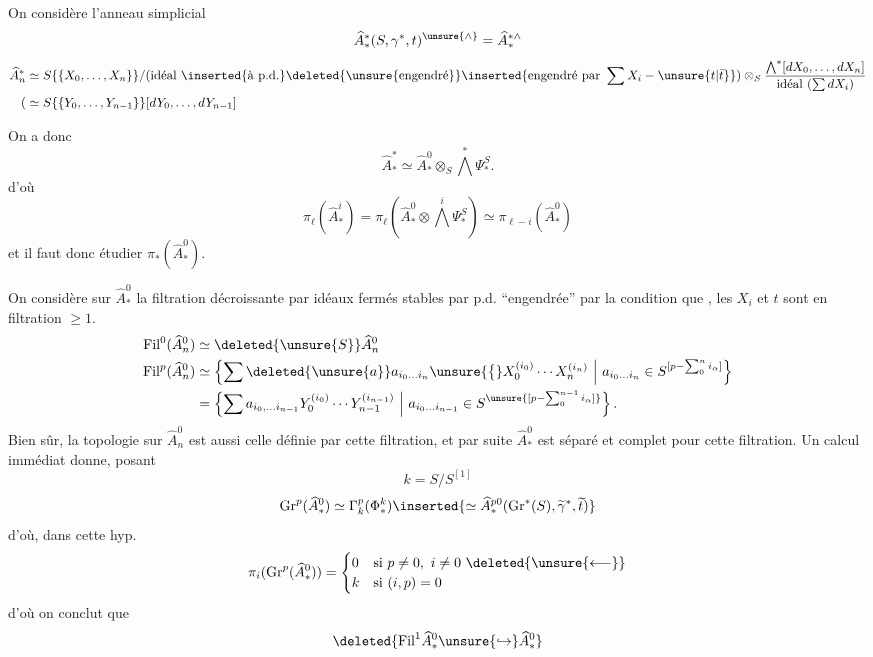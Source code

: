On considère l'anneau simplicial
\[
\widehat A_*^*(S,\gamma^*,t)^{\unsure{\wedge}}=\widehat A_*^{*\wedge}
\]
\[
\begin{aligned}
\widehat A_n^*&\simeq S\{\{X_0,\ldots,X_n\}\}/(\text{idéal }\inserted{\text{à p.d.}}\deleted{\text{\unsure{engendré}}}\inserted{\text{engendré par }\sum X_i-\unsure{t|\bar t}})\otimes_S\frac{\bigwedge^*[dX_0,\ldots,dX_n]}{\text{idéal }(\sum dX_i)}\\
(&\simeq S\{\{Y_0,\ldots,Y_{n-1}\}\}[dY_0,\ldots,dY_{n-1}]
\end{aligned}
\]
\deleted{$\simeq$}

On a donc
\[
\widehat A_*^*\simeq\widehat A_*^0\otimes_S\bigwedge^*\Psi_*^S.
\]
d'où
\[
\pi_\ell(\widehat A_*^i)=\pi_\ell(\widehat A_*^0\otimes\bigwedge^i\Psi_*^S)\simeq\pi_{\ell-i}(\widehat A_*^0)
\]
et il faut donc étudier $\pi_*(\widehat A_*^0)$.

On considère sur $\widehat A_*^0$  la filtration décroissante par idéaux fermés stables par p.d. ``engendrée'' par la condition que  , les $X_i$ et $t$ sont en filtration $\geq1$. 
\[
\begin{aligned}
\mathrm{Fil}^0(\widehat A_n^0)&\simeq\deleted{\unsure{S}}\widehat A_n^0\\
\mathrm{Fil}^p(\widehat A_n^0)&\simeq\left\{\sum\deleted{\unsure{a}}a_{i_0\ldots i_n}\unsure{\big\{}X_0^{(i_0)}\cdots X_n^{(i_n)}\ \middle|\ a_{i_0\ldots i_n}\in S^{[p-\sum_0^n i_\alpha]}\right\}\\
&=\left\{\sum a_{i_0,\ldots i_{n-1}}Y_0^{(i_0)}\cdots Y_{n-1}^{(i_{n-1})}\ \middle|\ a_{i_0\ldots i_{n-1}}\in S^{\unsure{[p-\sum_0^{n-1}i_\alpha]}}\right\}.
\end{aligned}
\]
Bien sûr, la topologie  sur $\widehat A_n^0$ est aussi celle définie par cette filtration, et par suite $\widehat A_*^0$ est séparé et complet pour cette filtration. Un calcul immédiat donne, posant
\[
k=S/S^{[1]}
\]
\[
\mathrm{Gr}^p(\widehat A_*^0)\simeq\Gamma_k^p(\Phi_*^k)
\inserted{\simeq\widehat A_*^{p0}(\mathrm{Gr}^*(S),\widetilde\gamma^*,\widetilde t)}
\]
d'où, dans cette hyp. 
\[
\pi_i(\mathrm{Gr}^p(\widehat A_*^0))=\begin{cases}0&\text{si }p\ne0,\ i\ne0\ \deleted{\unsure{\longleftarrow}}\\k&\text{si }(i,p)=0\end{cases}
\]
d'où on conclut que 
\[
\deleted{\mathrm{Fil}^1\widehat A_*^0\unsure{\hookrightarrow}\widehat A_*^0}
\]
